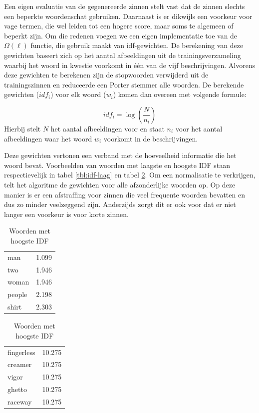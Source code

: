 Een eigen evaluatie van de gegenereerde zinnen stelt vast dat de zinnen slechts een beperkte woordenschat gebruiken. Daarnaast is er dikwijls een voorkeur voor vage termen, die wel leiden tot een hogere score, maar soms te algemeen of beperkt zijn.
Om die redenen voegen we een eigen implementatie toe van de $\Omega(\ell)$ functie, die gebruik maakt van idf-gewichten. De berekening van deze gewichten baseert zich op het aantal afbeeldingen uit de trainingsverzameling waarbij het woord in kwestie voorkomt in \'e\'en van de vijf beschrijvingen. Alvorens deze gewichten te berekenen zijn de stopwoorden verwijderd uit de trainingszinnen en reduceerde een Porter stemmer alle woorden. De berekende gewichten ($idf_i$) voor elk woord ($w_i$) komen dan overeen met volgende formule: 

\begin{equation}
    idf_i = \log(\frac{N}{n_i})
\end{equation}
Hierbij stelt $N$ het aantal afbeeldingen voor en staat $n_i$ voor het aantal afbeeldingen waar het woord $w_i$ voorkomt in de beschrijvingen.

Deze gewichten vertonen een verband met de hoeveelheid informatie die het woord bevat. Voorbeelden van woorden met laagste en hoogste IDF staan respectievelijk in tabel \ref{tbl:idf-laag} en tabel \ref{tbl:idf-hoog}. Om een normalisatie te verkrijgen, telt het algoritme de gewichten voor alle afzonderlijke woorden op. Op deze manier is er een afstraffing voor zinnen die veel frequente woorden bevatten en dus zo minder veelzeggend zijn. Anderzijds zorgt dit er ook voor dat er niet langer een voorkeur is voor korte zinnen.


\begin{table}[!htb]
	\caption*{Gestemde woorden samen met hun IDF-gewicht}
	\begin{minipage}{.5\linewidth}
		\caption{Woorden met laagste IDF}
		\label{tbl:idf-laag}
		\centering
		\begin{tabular}{ll}
    man    & 1.099 \\
    two    & 1.946 \\
    woman  & 1.946 \\
    people & 2.198 \\
    shirt  & 2.303 \\
		\end{tabular}
	\end{minipage}%
	\begin{minipage}{.5\linewidth}
		\centering
		\caption{Woorden met hoogste IDF}
		\label{tbl:idf-hoog}
		\begin{tabular}{ll}
	fingerless & 10.275\\
	creamer& 10.275\\
	vigor& 10.275\\
	ghetto& 10.275\\
	raceway& 10.275\\
		\end{tabular}
	\end{minipage} 
\end{table}

